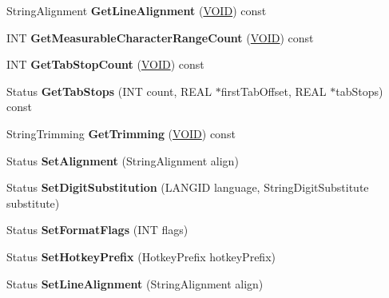 \begin{DoxyCompactItemize}
\mbox{\label{class_string_format_a35e58ee6489026f69aef7759709e2c86}} 
String\+Alignment {\bfseries Get\+Line\+Alignment} (\hyperlink{interfacevoid}{V\+O\+ID}) const
\item 
\mbox{\label{class_string_format_ab7012c403589c767adb7eb897f0beb9f}} 
I\+NT {\bfseries Get\+Measurable\+Character\+Range\+Count} (\hyperlink{interfacevoid}{V\+O\+ID}) const
\item 
\mbox{\label{class_string_format_ab8b5f4c13a9ab7d991555ab565526071}} 
I\+NT {\bfseries Get\+Tab\+Stop\+Count} (\hyperlink{interfacevoid}{V\+O\+ID}) const
\item 
\mbox{\label{class_string_format_a184d8a7c10561b7b4059dbc9fc67309f}} 
Status {\bfseries Get\+Tab\+Stops} (I\+NT count, R\+E\+AL $\ast$first\+Tab\+Offset, R\+E\+AL $\ast$tab\+Stops) const
\item 
\mbox{\label{class_string_format_a4ae74cf695d66f62aba52ceec604ff1c}} 
String\+Trimming {\bfseries Get\+Trimming} (\hyperlink{interfacevoid}{V\+O\+ID}) const
\item 
\mbox{\label{class_string_format_ae882e162125587e5eaf34807e5020742}} 
Status {\bfseries Set\+Alignment} (String\+Alignment align)
\item 
\mbox{\label{class_string_format_a11283d3b75b2fe4985240e5b624ee7fa}} 
Status {\bfseries Set\+Digit\+Substitution} (L\+A\+N\+G\+ID language, String\+Digit\+Substitute substitute)
\item 
\mbox{\label{class_string_format_a858406aed9290ac5a17985d14ab9ba77}} 
Status {\bfseries Set\+Format\+Flags} (I\+NT flags)
\item 
\mbox{\label{class_string_format_a7eb52e9f3cc7a4ed381b24d9f23bd472}} 
Status {\bfseries Set\+Hotkey\+Prefix} (Hotkey\+Prefix hotkey\+Prefix)
\item 
\mbox{\label{class_string_format_aaf1be6b9e8444176e12953fe88b75298}} 
Status {\bfseries Set\+Line\+Alignment} (String\+Alignment align)

\end{DoxyCompactItemize}
